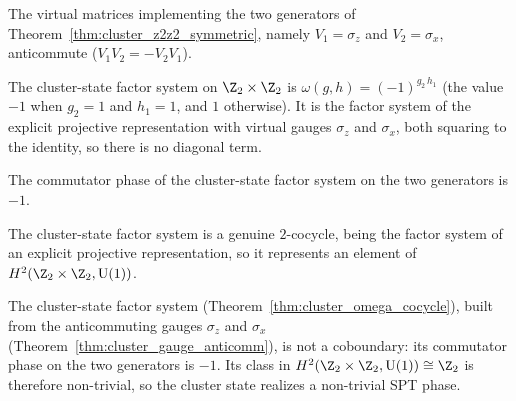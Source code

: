\begin{theorem}\label{thm:cluster_gauge_anticomm}
    \leanok
    The virtual matrices implementing the two generators of
    Theorem~\ref{thm:cluster_z2z2_symmetric}, namely $V_1 = \sigma_z$ and
    $V_2 = \sigma_x$, anticommute ($V_1 V_2 = -V_2 V_1$).
\end{theorem}

\begin{definition}\label{def:cluster_omega}
    \leanok
    The cluster-state factor system on $\Z_2 \times \Z_2$ is
    $\omega(g,h) = (-1)^{g_2\,h_1}$ (the value $-1$ when $g_2 = 1$ and $h_1 = 1$,
    and $1$ otherwise).  It is the factor system of the explicit projective
    representation with virtual gauges $\sigma_z$ and $\sigma_x$, both squaring to
    the identity, so there is no diagonal term.
\end{definition}

\begin{lemma}\label{lem:cluster_comm_phase_neg_one}
    \leanok
    The commutator phase of the cluster-state factor system on the two generators
    is $-1$.
\end{lemma}

\begin{theorem}\label{thm:cluster_omega_cocycle}
    \leanok
    The cluster-state factor system is a genuine $2$-cocycle, being the factor
    system of an explicit projective representation, so it represents an element
    of $H^2(\Z_2 \times \Z_2, \mathrm{U}(1))$.
\end{theorem}

\begin{theorem}\label{thm:cluster_nontrivial_spt}
    \leanok
    The cluster-state factor system (Theorem~\ref{thm:cluster_omega_cocycle}),
    built from the anticommuting gauges $\sigma_z$ and $\sigma_x$
    (Theorem~\ref{thm:cluster_gauge_anticomm}), is not a coboundary: its
    commutator phase on the two generators is $-1$.  Its class in
    $H^2(\Z_2 \times \Z_2, \mathrm{U}(1)) \cong \Z_2$ is therefore non-trivial, so
    the cluster state realizes a non-trivial SPT phase.
\end{theorem}

